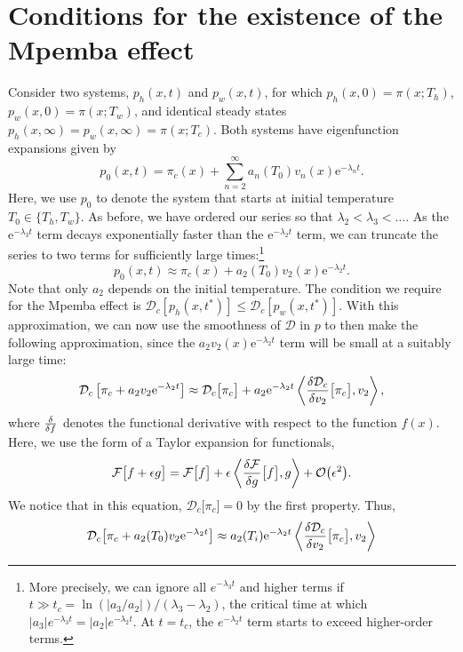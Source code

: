 \documentclass[hyperref={colorlinks=true, urlcolor=blue, citecolor=blue, final, bound}]{sfuthesis}
\newcommand{\e}{\mathrm{e}}
\begin{document}
\section{Conditions for the existence of the Mpemba effect}
Consider two systems, $p_h(x,t)$ and $p_w(x,t)$, for which $p_h(x,0)=\pi(x;T_h)$, $p_w(x,0)=\pi(x;T_w)$, and identical steady states $p_h(x,\infty)=p_w(x,\infty)=\pi(x;T_c)$. Both systems have eigenfunction expansions given by
\begin{equation}
    p_0(x,t) = \pi_c(x) + \sum_{n=2}^\infty a_n(T_0) v_n(x)\e^{-\lambda_n t}.
\end{equation}
Here, we use $p_0$ to denote the system that starts at initial temperature $T_0\in\{T_h,T_w\}$.
As before, we have ordered our series so that $\lambda_2<\lambda_3<\dots$. As the $\e^{-\lambda_3 t}$ term decays exponentially faster than the $\e^{-\lambda_2 t}$ term, we can truncate the series to two terms for sufficiently large times:\footnote{More precisely, we can ignore all $e^{-\lambda_3t}$ and higher terms if $t\gg t_c = \ln(|a_3/a_2|)/(\lambda_3-\lambda_2)$, the critical time at which $|a_3|e^{-\lambda_3 t}=|a_2|e^{-\lambda_2t}$. At $t=t_c$, the $e^{-\lambda_2 t}$ term starts to exceed higher-order terms.}
\begin{equation}
    p_0(x,t) \approx \pi_c(x) + a_2(T_0) v_2(x)\e^{-\lambda_2 t}.
\end{equation} 
Note that only $a_2$ depends on the initial temperature. The condition we require for the Mpemba effect is $\mathcal D_c[p_h(x,t^*)] \leq \mathcal D_c[p_w(x,t^*)]$. With this approximation, we can now use the smoothness of $\mathcal D$ in $p$ to then make the following approximation, since the $a_2v_2(x)\e^{-\lambda_2t}$ term will be small at a suitably large time:
\begin{equation}
    \mathcal D_c\left[ \pi_c+a_2v_2\e^{-\lambda_2 t} \right] \approx \mathcal D_c\big[\pi_c\big] + a_2\e^{-\lambda_2 t}\ev{\fdv{\mathcal D_c}{v_2}\big[\pi_c\big], v_2},
\end{equation}
where $\fdv{}{f}$ denotes the functional derivative with respect to the function $f(x)$. Here, we use the form of a Taylor expansion for functionals,
\begin{equation}
    \mathcal F\big[ f+\epsilon g \big] = \mathcal F\big[f\big] + \epsilon \ev{\fdv{\mathcal F}{g}\big[f\big],g} + \order{\epsilon^2}.
\end{equation}
We notice that in this equation, $\mathcal D_c\big[{\pi_c}\big]=0$ by the first property. Thus,
\begin{align}
    \mathcal D_c\big[\pi_c+a_2(T_0)v_2\e^{-\lambda_2 t}\big] \approx a_2(T_i)\e^{-\lambda_2 t}\ev{\fdv{\mathcal D_c}{v_2}\big[\pi_c\big],v_2}
\end{align}
\end{document}
